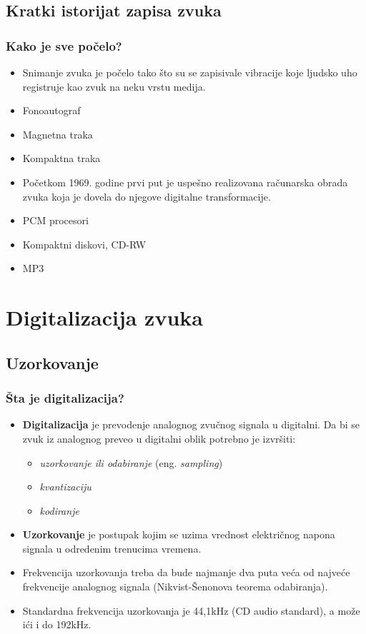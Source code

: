 \documentclass{beamer}
\begin{document}
\subsection{Kratki istorijat zapisa zvuka}
\begin{frame}[fragile]\frametitle{Kako je sve počelo?}
	\begin{itemize}	
		\item Snimanje zvuka je počelo tako što su se zapisivale vibracije koje ljudsko uho registruje kao zvuk na neku vrstu medija.
		\item Fonoautograf
		\item Magnetna traka
        \item Kompaktna traka
		\item Početkom 1969. godine prvi put je uspešno realizovana računarska obrada zvuka koja je dovela do njegove digitalne transformacije.
		\item PCM procesori
		\item Kompaktni diskovi, CD-RW
		\item MP3
	\end{itemize}
\end{frame}

\section{Digitalizacija zvuka}
\subsection{Uzorkovanje}
\begin{frame}[fragile]\frametitle{Šta je digitalizacija?}
\begin{itemize}
	\item \textbf{Digitalizacija} je prevodenje analognog zvučnog signala u digitalni. Da bi se zvuk iz analognog preveo u digitalni oblik potrebno je izvršiti:
    \begin{itemize}			
		\item \textit{uzorkovanje ili odabiranje} (eng. \textit{sampling})
		\item \textit{kvantizaciju}
        \item \textit{kodiranje}
    \end{itemize}
	\item \textbf{Uzorkovanje} je postupak kojim se uzima vrednost električnog napona signala u odredenim trenucima vremena.
	\item Frekvencija uzorkovanja treba da bude najmanje dva puta veća od najveće frekvencije analognog signala (Nikvist-Šenonova teorema odabiranja).
	\item Standardna frekvencija uzorkovanja je 44,1kHz (CD audio standard), a može ići i do 192kHz. 
\end{itemize}

\end{frame}
\end{document}
